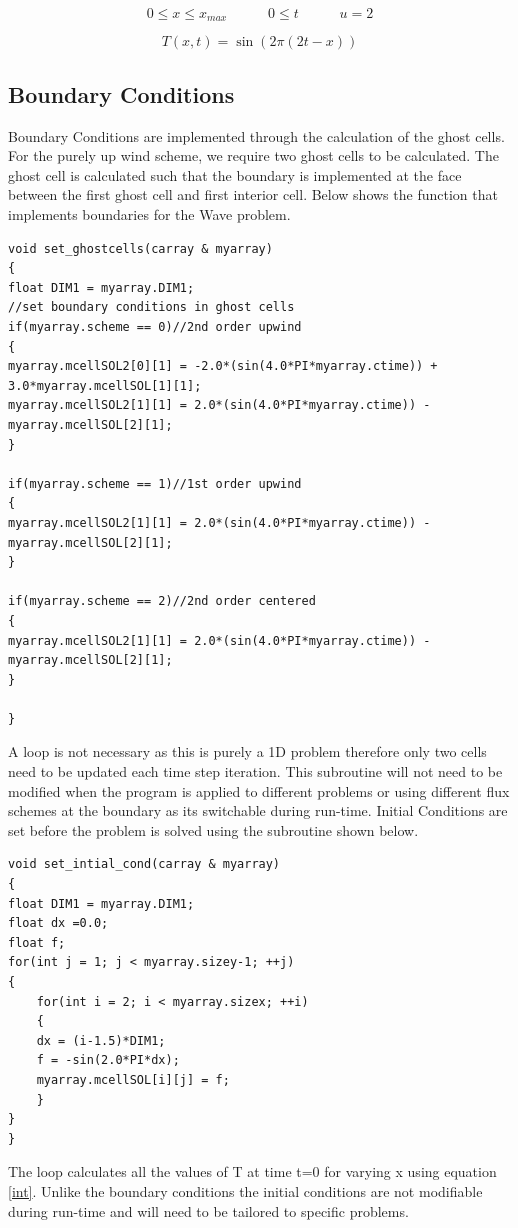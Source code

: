 \documentclass[paper=a4, fontsize=11pt, abstract=on]{scrartcl}
\numberwithin{equation}{section}		%
\numberwithin{figure}{section}			%
\numberwithin{table}{section}				%
\begin{document}
 \begin{equation}
\label{con}
0\leq x \leq x_{max} \hspace{35pt} 0 \leq t \hspace{35pt} u = 2
\end{equation}

 \begin{equation}
\label{ddd}
T(x,t) = \sin{(2\pi (2t-x))}
\end{equation}

\subsection{Boundary Conditions}
Boundary Conditions are implemented through the calculation of the ghost cells. For the purely up wind scheme, we require two ghost cells to be calculated. The ghost cell is calculated such that the boundary is implemented at the face between the first ghost cell and first interior cell. Below shows the function that implements boundaries for the Wave problem.

\begin{lstlisting}
void set_ghostcells(carray & myarray)
{
float DIM1 = myarray.DIM1;
//set boundary conditions in ghost cells
if(myarray.scheme == 0)//2nd order upwind
{
myarray.mcellSOL2[0][1] = -2.0*(sin(4.0*PI*myarray.ctime)) + 3.0*myarray.mcellSOL[1][1];
myarray.mcellSOL2[1][1] = 2.0*(sin(4.0*PI*myarray.ctime)) - myarray.mcellSOL[2][1];
}

if(myarray.scheme == 1)//1st order upwind
{
myarray.mcellSOL2[1][1] = 2.0*(sin(4.0*PI*myarray.ctime)) - myarray.mcellSOL[2][1];
}

if(myarray.scheme == 2)//2nd order centered
{
myarray.mcellSOL2[1][1] = 2.0*(sin(4.0*PI*myarray.ctime)) - myarray.mcellSOL[2][1];
}

}
\end{lstlisting}
A loop is not necessary as this is purely a 1D problem therefore only two cells need to be updated each time step iteration. This subroutine will not need to be modified when the program is applied to different problems or using different flux schemes at the boundary as its switchable during run-time. Initial Conditions are set before the problem is solved using the subroutine shown below.
\begin{lstlisting}
void set_intial_cond(carray & myarray)
{
float DIM1 = myarray.DIM1;
float dx =0.0;
float f;
for(int j = 1; j < myarray.sizey-1; ++j)
{
    for(int i = 2; i < myarray.sizex; ++i)
    {
    dx = (i-1.5)*DIM1;
    f = -sin(2.0*PI*dx);
    myarray.mcellSOL[i][j] = f;
    }
}
}
\end{lstlisting}
The loop calculates all the values of T at time t=0 for varying x using equation \ref{int}. Unlike the boundary conditions the initial conditions are not modifiable during run-time and will need to be tailored to specific problems.
\end{document}
